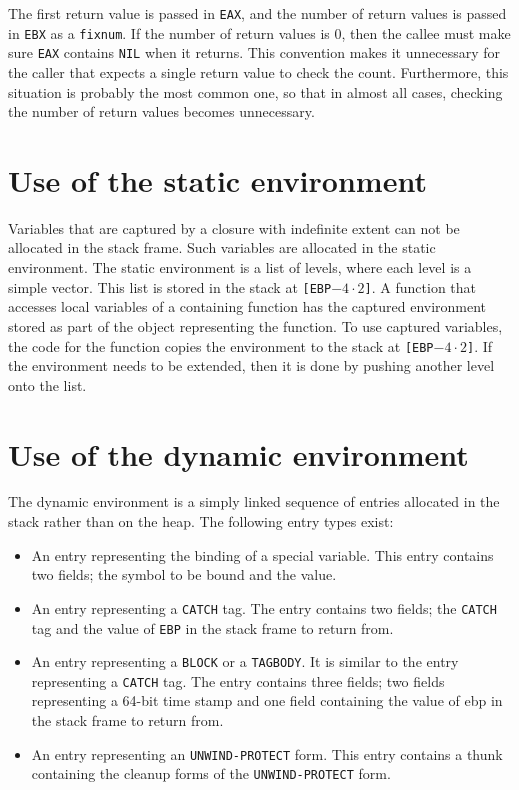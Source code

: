 The first return value is passed in \texttt{EAX}, and the number of
return values is passed in \texttt{EBX} as a \texttt{fixnum}.  If the
number of return values is $0$, then the callee must make sure
\texttt{EAX} contains \texttt{NIL} when it returns.  This convention
makes it unnecessary for the caller that expects a single return value
to check the count.  Furthermore, this situation is probably the most
common one, so that in almost all cases, checking the number of return
values becomes unnecessary.

\section{Use of the static environment}
\label{backends-x86-32-static-environment}

Variables that are captured by a closure with indefinite extent can
not be allocated in the stack frame.  Such variables are allocated in
the static environment.  The static environment is a list of levels,
where each level is a simple vector.  This list is stored in the stack
at \texttt{[EBP$-4 \cdot 2$]}.  A function that accesses local
variables of a containing function has the captured environment stored
as part of the object representing the function.  To use captured
variables, the code for the function copies the environment to the
stack at \texttt{[EBP$-4 \cdot 2$]}.  If the environment needs to be
extended, then it is done by pushing another level onto the list.

\section{Use of the dynamic environment}

The dynamic environment is a simply linked sequence of entries
allocated in the stack rather than on the heap.  The following entry
types exist:

\begin{itemize}
  \item An entry representing the binding of a special variable.  This
    entry contains two fields; the symbol to be bound and the value.

  \item An entry representing a \texttt{CATCH} tag.  The entry
    contains two fields; the \texttt{CATCH} tag and the value of
    \texttt{EBP} in the stack frame to return from.

  \item An entry representing a \texttt{BLOCK} or a \texttt{TAGBODY}.
    It is similar to the entry representing a \texttt{CATCH} tag.  The
    entry contains three fields; two fields representing a 64-bit time
    stamp and one field containing the value of ebp in the stack frame
    to return from.

  \item An entry representing an \texttt{UNWIND-PROTECT} form.  This
    entry contains a thunk containing the cleanup forms of the
    \texttt{UNWIND-PROTECT} form.
\end{itemize}

